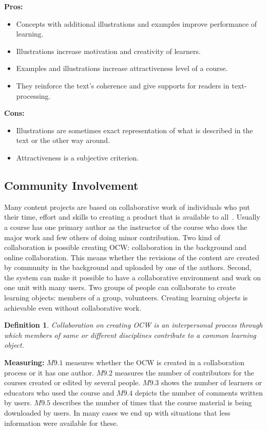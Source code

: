\documentclass{sig-alternate}
\theoremstyle{definition}
\newtheorem{defn}{Definition}
\begin{document}
\noindent\textbf{Pros:}
\begin{itemize}
\item Concepts with additional illustrations and examples improve performance of learning.
\item Illustrations increase motivation and creativity of learners.
\item Examples and illustrations increase attractiveness level of a course.
\item They reinforce the text’s coherence and give supports for readers in text-processing. \end{itemize}
\noindent\textbf{Cons:}
\begin{itemize}
\item Illustrations are sometimes exact representation of what is described in the text or the other way around.
\item Attractiveness is a subjective criterion.
\end{itemize}

\subsection{Community Involvement}
\label{sec:Involvement}
Many content projects are based on collaborative work of individuals who put their time, effort and skills to creating a product that is available to all~\parencite{Oreg.2008}.
Usually a course has one primary author as the instructor of the course who does the major work and few others of doing minor contribution.
Two kind of collaboration is possible creating OCW: collaboration in the background and online collaboration.
This means whether the revisions of the content are created by community in the background and uploaded by one of the authors.
Second, the system can make it possible to have a collaborative environment and work on one unit with many users.
Two groups of people can collaborate to create learning objects: members of a group, volunteers.
Creating learning objects is achievable even without collaborative work.



\begin{defn}
\emph {Collaboration on creating OCW is an interpersonal process through which members of same or different disciplines contribute to a common learning object.}
\end{defn}

\noindent\textbf{Measuring:}
$M9.1$ measures whether the OCW is created in a collaboration process or it has one author.
$M9.2$ measures the number of contributors for the courses created or edited by several people.
$M9.3$ shows the number of learners or educators who used the course and $M9.4$ depicts the number of comments written by users.
$M9.5$ describes the number of times that the course material is being downloaded by users.
In many cases we end up with situations that less information were available for these.
\end{document}
